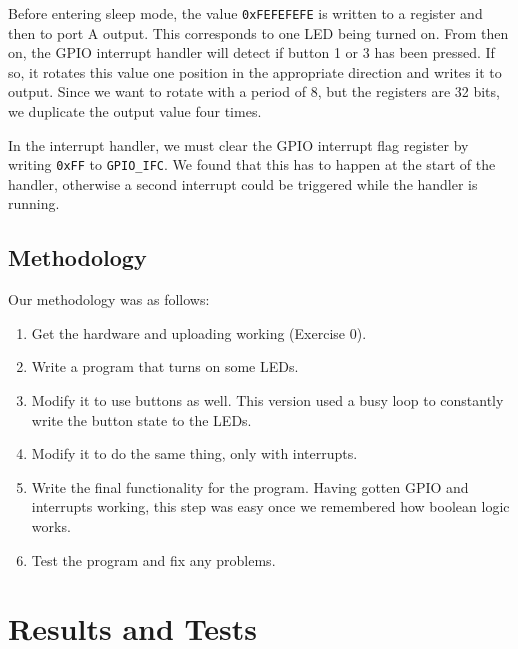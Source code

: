 \documentclass[a4paper, 12pt]{article}
\begin{document}
        Before entering sleep mode, the value \texttt{0xFEFEFEFE} is written to a register and then to port A output. This corresponds to one LED being turned on. From then on, the GPIO interrupt handler will detect if button 1 or 3 has been pressed. If so, it rotates this value one position in the appropriate direction and writes it to output. Since we want to rotate with a period of 8, but the registers are 32 bits, we duplicate the output value four times.

        In the interrupt handler, we must clear the GPIO interrupt flag register by writing \texttt{0xFF} to \texttt{GPIO\_IFC}. We found that this has to happen at the start of the handler, otherwise a second interrupt could be triggered while the handler is running.

    \subsection{Methodology} %
    \label{sub:methodology}
        Our methodology was as follows:
        \begin{enumerate}
            \item Get the hardware and uploading working (Exercise 0).
            \item Write a program that turns on some LEDs.
            \item Modify it to use buttons as well. This version used a busy loop to constantly write the button state to the LEDs.
            \item Modify it to do the same thing, only with interrupts.
            \item Write the final functionality for the program. Having gotten GPIO and interrupts working, this step was easy once we remembered how boolean logic works.
            \item Test the program and fix any problems.
        \end{enumerate}

\section{Results and Tests} %
\label{sec:results_and_tests}
\end{document}
